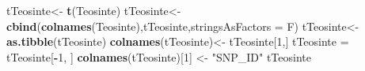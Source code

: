 \documentclass[]{article}
\newenvironment{Shaded}{\begin{snugshade}}{\end{snugshade}}
\newcommand{\KeywordTok}[1]{\textcolor[rgb]{0.13,0.29,0.53}{\textbf{#1}}}
\newcommand{\DataTypeTok}[1]{\textcolor[rgb]{0.13,0.29,0.53}{#1}}
\newcommand{\DecValTok}[1]{\textcolor[rgb]{0.00,0.00,0.81}{#1}}
\newcommand{\StringTok}[1]{\textcolor[rgb]{0.31,0.60,0.02}{#1}}
\newcommand{\OperatorTok}[1]{\textcolor[rgb]{0.81,0.36,0.00}{\textbf{#1}}}
\newcommand{\NormalTok}[1]{#1}
\begin{document}
\begin{Shaded}
\begin{Highlighting}[]
\NormalTok{tTeosinte<-}\StringTok{ }\KeywordTok{t}\NormalTok{(Teosinte)}
\NormalTok{tTeosinte<-}\KeywordTok{cbind}\NormalTok{(}\KeywordTok{colnames}\NormalTok{(Teosinte),tTeosinte,}\DataTypeTok{stringsAsFactors =}\NormalTok{ F)}
\NormalTok{tTeosinte<-}\KeywordTok{as.tibble}\NormalTok{(tTeosinte)}
\KeywordTok{colnames}\NormalTok{(tTeosinte)<-}\StringTok{ }\NormalTok{tTeosinte[}\DecValTok{1}\NormalTok{,]}
\NormalTok{tTeosinte =}\StringTok{ }\NormalTok{tTeosinte[}\OperatorTok{-}\DecValTok{1}\NormalTok{, ]}
\KeywordTok{colnames}\NormalTok{(tTeosinte)[}\DecValTok{1}\NormalTok{] <-}\StringTok{ "SNP_ID"}
\NormalTok{tTeosinte}
\end{Highlighting}
\end{Shaded}
\end{document}
